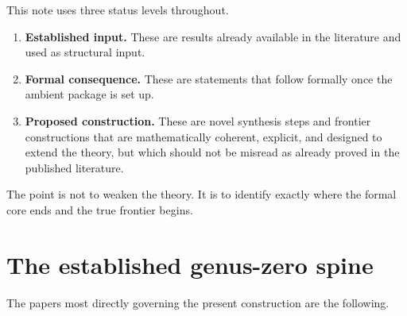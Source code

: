 \documentclass[11pt,oneside]{memoir}
\numberwithin{equation}{chapter}
\theoremstyle{definition}
\begin{document}
This note uses three status levels throughout.
\begin{enumerate}[label=\textup{(\roman*)},leftmargin=2.8em]
\item \textbf{Established input.}  These are results already available in the literature and used as structural input.
\item \textbf{Formal consequence.}  These are statements that follow formally once the ambient package is set up.
\item \textbf{Proposed construction.}  These are novel synthesis steps and frontier constructions that are mathematically coherent, explicit, and designed to extend the theory, but which should not be misread as already proved in the published literature.
\end{enumerate}

The point is not to weaken the theory.  It is to identify exactly where the formal core ends and the true frontier begins.

\section{The established genus-zero spine}

The papers most directly governing the present construction are the following.
\end{document}
